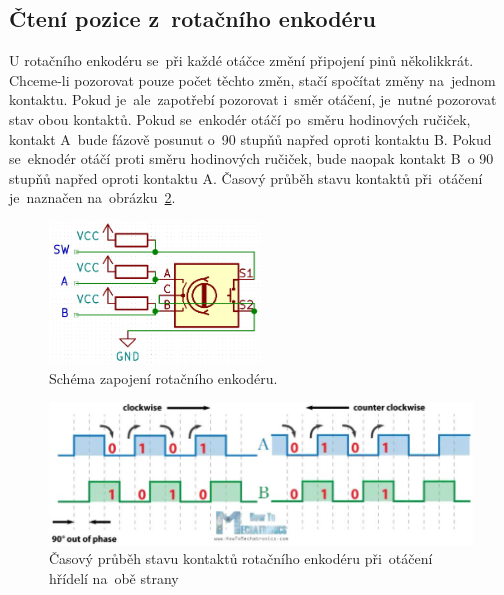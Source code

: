 

\subsection{Čtení pozice z~rotačního enkodéru}
U rotačního enkodéru se~při každé otáčce změní připojení pinů několikkrát. Chceme-li pozorovat pouze počet těchto změn, stačí spočítat změny na~jednom kontaktu. Pokud je~ale~zapotřebí pozorovat i~směr otáčení, je~nutné pozorovat stav obou kontaktů. Pokud se~enkodér otáčí po~směru hodinových ručiček, kontakt A~bude fázově posunut o~90 stupňů napřed oproti kontaktu B.
Pokud se~eknodér otáčí proti směru hodinových ručiček, bude naopak kontakt B~o 90 stupňů napřed oproti kontaktu A. Časový průběh stavu kontaktů při~otáčení je~naznačen na~obrázku~\ref{fig:encoder_data}.
\begin{figure}[htb]
  \centering
  \includegraphics[width=0.5\textwidth]{img/encoder-pinout.jpg}
  \caption{\label{fig:encoder-pinout} Schéma zapojení rotačního enkodéru.}
\end{figure}
\begin{figure}[htb]
  \centering
  \includegraphics[width=1\textwidth]{img/encoder_data.jpg}
  \centering
  \caption{\label{fig:encoder_data} Časový průběh stavu kontaktů rotačního enkodéru při~otáčení hřídelí na~obě strany}
\end{figure}
